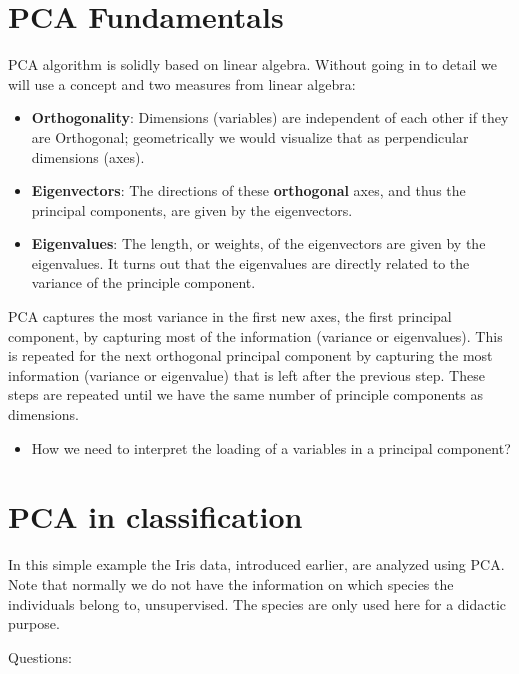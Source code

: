 \documentclass[
]{book}
\providecommand{\tightlist}{%
  \setlength{\itemsep}{0pt}\setlength{\parskip}{0pt}}
\begin{document}
\hypertarget{pca-fundamentals}{%
\chapter{PCA Fundamentals}\label{pca-fundamentals}}

PCA algorithm is solidly based on linear algebra. Without going in to detail we will use a concept and two measures from linear algebra:

\begin{itemize}
\tightlist
\item
  \textbf{Orthogonality}: Dimensions (variables) are independent of each other if they are Orthogonal; geometrically we would visualize that as perpendicular dimensions (axes).
\item
  \textbf{Eigenvectors}: The directions of these \textbf{orthogonal} axes, and thus the principal components, are given by the eigenvectors.
\item
  \textbf{Eigenvalues}: The length, or weights, of the eigenvectors are given by the eigenvalues. It turns out that the eigenvalues are directly related to the variance of the principle component.
\end{itemize}

PCA captures the most variance in the first new axes, the first principal component, by capturing most of the information (variance or eigenvalues). This is repeated for the next orthogonal principal component by capturing the most information (variance or eigenvalue) that is left after the previous step. These steps are repeated until we have the same number of principle components as dimensions.

\begin{itemize}
\tightlist
\item
  How we need to interpret the loading of a variables in a principal component?
\end{itemize}

\hypertarget{pca-in-classification}{%
\chapter{PCA in classification}\label{pca-in-classification}}

In this simple example the Iris data, introduced earlier, are analyzed using PCA. Note that normally we do not have the information on which species the individuals belong to, unsupervised. The species are only used here for a didactic purpose.

Questions:
\end{document}
